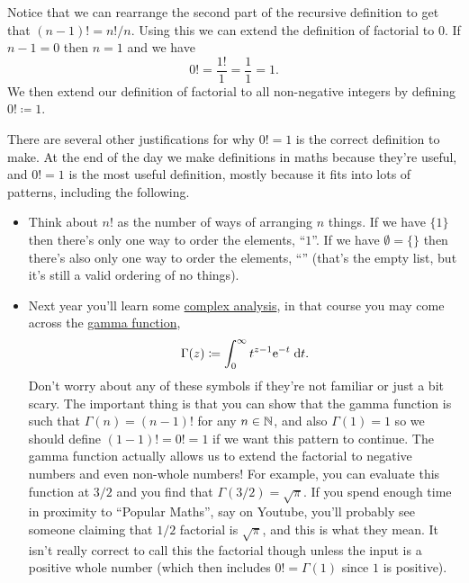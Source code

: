 \documentclass[fleqn]{LectureClass/LectureClass}
\begin{document}
    Notice that we can rearrange the second part of the recursive definition to get that \((n-1)! = n!/n\).
    Using this we can extend the definition of factorial to \(0\).
    If \(n - 1 = 0\) then \(n = 1\) and we have
    \begin{equation}
        0! = \frac{1!}{1} = \frac{1}{1} = 1.
    \end{equation}
    We then extend our definition of factorial to all non-negative integers by defining \(0! \coloneq 1\).
    
    \begin{remark}{}{}
        There are several other justifications for why \(0! = 1\) is the correct definition to make.
        At the end of the day we make definitions in maths because they're useful, and \(0! = 1\) is the most useful definition, mostly because it fits into lots of patterns, including the following.
        
        \begin{itemize}
            \item Think about \(n!\) as the number of ways of arranging \(n\) things.
            If we have \(\{1\}\) then there's only one way to order the elements, \enquote{\(1\)}.
            If we have \(\emptyset = \{\}\) then there's also only one way to order the elements, \enquote{\(\)} (that's the empty list, but it's still a valid ordering of no things).
        
            \item Next year you'll learn some \href{https://en.wikipedia.org/wiki/Complex_analysis}{complex analysis}, in that course you may come across the \href{https://en.wikipedia.org/wiki/Gamma_function}{gamma function},
            \begin{equation}
                \Gamma(z) \coloneq \int_0^{\infty} t^{z - 1} \e^{-t} \dd{t}.
            \end{equation}
            Don't worry about any of these symbols if they're not familiar or just a bit scary.
            The important thing is that you can show that the gamma function is such that \(\Gamma(n) = (n - 1)!\) for any \(n \in \mathbb{N}\), and also \(\Gamma(1) = 1\) so we should define \((1 - 1)! = 0! = 1\) if we want this pattern to continue.
            The gamma function actually allows us to extend the factorial to negative numbers and even non-whole numbers!
            For example, you can evaluate this function at \(3/2\) and you find that \(\Gamma(3/2) = \sqrt{\pi}\).
            If you spend enough time in proximity to \enquote{Popular Maths}, say on Youtube, you'll probably see someone claiming that \(1/2\) factorial is \(\sqrt{\pi}\), and this is what they mean.
            It isn't really correct to call this the factorial though unless the input is a positive whole number (which then includes \(0! = \Gamma(1)\) since \(1\) is positive).
        \end{itemize}
     \end{remark}
     
\end{document}
